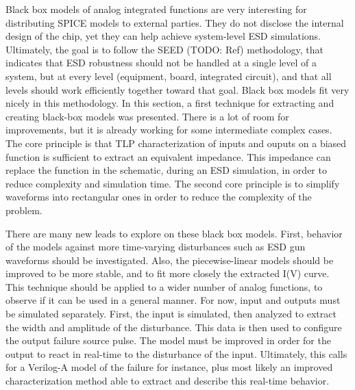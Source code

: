 

Black box models of analog integrated functions are very interesting for distributing SPICE models to external parties.
They do not disclose the internal design of the chip, yet they can help achieve system-level ESD simulations.
Ultimately, the goal is to follow the SEED (TODO: Ref) methodology, that indicates that ESD robustness should not be handled at a single level of a system, but at every level (equipment, board, integrated circuit), and that all levels should work efficiently together toward that goal.
Black box models fit very nicely in this methodology.
In this section, a first technique for extracting and creating black-box models was presented.
There is a lot of room for improvements, but it is already working for some intermediate complex cases.
The core principle is that TLP characterization of inputs and ouputs on a biased function is sufficient to extract an equivalent impedance.
This impedance can replace the function in the schematic, during an ESD simulation, in order to reduce complexity and simulation time.
The second core principle is to simplify waveforms into rectangular ones in order to reduce the complexity of the problem.

There are many new leads to explore on these black box models.
First, behavior of the models against more time-varying disturbances such as ESD gun waveforms should be investigated.
Also, the piecewise-linear models should be improved to be more stable, and to fit more closely the extracted I(V) curve.
This technique should be applied to a wider number of analog functions, to observe if it can be used in a general manner.
For now, input and outputs must be simulated separately.
First, the input is simulated, then analyzed to extract the width and amplitude of the disturbance.
This data is then used to configure the output failure source pulse.
The model must be improved in order for the output to react in real-time to the disturbance of the input.
Ultimately, this calls for a Verilog-A model of the failure for instance, plus most likely an improved characterization method able to extract and describe this real-time behavior.
